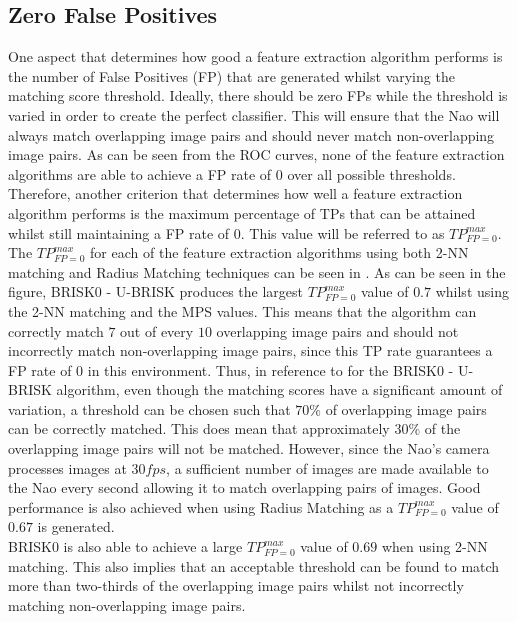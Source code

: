 \documentclass{report}
\begin{document}
\subsection{Zero False Positives}
\label{sec:zfp}
One aspect that determines how good a feature extraction algorithm performs is the number of False Positives (FP) that are generated whilst varying the matching score threshold. Ideally, there should be zero FPs while the threshold is varied in order to create the perfect classifier. This will ensure that the Nao will always match overlapping image pairs and should never match non-overlapping image pairs. As can be seen from the ROC curves, none of the feature extraction algorithms are able to achieve a FP rate of $0$ over all possible thresholds.\\

Therefore, another criterion that determines how well a feature extraction algorithm performs is the maximum percentage of TPs that can be attained whilst still maintaining a FP rate of $0$. This value will be referred to as $TP_{FP=0}^{max}$.  \\

The $TP_{FP=0}^{max}$ for each of the feature extraction algorithms using both 2-NN matching and Radius Matching techniques can be seen in . As can be seen in the figure, BRISK0 - U-BRISK produces the largest $TP_{FP=0}^{max}$ value of $0.7$ whilst using the 2-NN matching and the MPS values. This means that the algorithm can correctly match $7$ out of every $10$ overlapping image pairs and should not incorrectly match non-overlapping image pairs, since this TP rate guarantees a FP rate of $0$ in this environment. Thus, in reference to  for the BRISK0 - U-BRISK algorithm, even though the matching scores have a significant amount of variation, a threshold can be chosen such that $70\%$ of overlapping image pairs can be correctly matched. This does mean that approximately $30\%$ of the overlapping image pairs will not be matched. However, since the Nao's camera processes images at $30 fps$, a sufficient number of images are made available to the Nao every second allowing it to match overlapping pairs of images. Good performance is also achieved when using Radius Matching as a $TP_{FP=0}^{max}$ value of $0.67$ is generated.\\ 

BRISK0 is also able to achieve a large $TP_{FP=0}^{max}$ value of $0.69$ when using 2-NN matching. This also implies that an acceptable threshold can be found to match more than two-thirds of the overlapping image pairs whilst not incorrectly matching non-overlapping image pairs.\\
\end{document}

